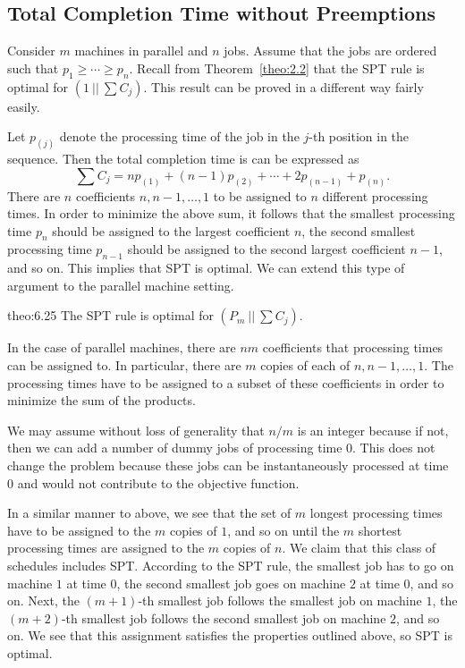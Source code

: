 \subsection{Total Completion Time without Preemptions} \label{subsec:6.4}
Consider $m$ machines in parallel and $n$ jobs. Assume that the 
jobs are ordered such that $p_1 \geq \cdots \geq p_n$. Recall from 
Theorem~\ref{theo:2.2} that the SPT rule is optimal for $(1~||~\sum C_j)$. 
This result can be proved in a different way fairly easily. 

Let $p_{(j)}$ denote the processing time of the job in the $j$-th position 
in the sequence. Then the total completion time is can be expressed as 
\[ \sum C_j = np_{(1)} + (n-1)p_{(2)} + \cdots + 2p_{(n-1)} + p_{(n)}. \] 
There are $n$ coefficients $n, n-1, \dots, 1$ to be assigned to 
$n$ different processing times. In order to minimize the above sum, 
it follows that the smallest processing time $p_n$ should be assigned to 
the largest coefficient $n$, the second smallest processing time $p_{n-1}$ 
should be assigned to the second largest coefficient $n-1$, and so on.
This implies that SPT is optimal. We can extend this type of argument 
to the parallel machine setting. 

\begin{theo}{theo:6.25}
    The SPT rule is optimal for $(P_m~||~\sum C_j)$. 
\end{theo}
\begin{pf}
    In the case of parallel machines, there are $nm$ coefficients that
    processing times can be assigned to. In particular, there are $m$ 
    copies of each of $n, n-1, \dots, 1$. The processing times have to be 
    assigned to a subset of these coefficients in order to minimize the sum of 
    the products. 

    We may assume without loss of generality that $n/m$ is an integer 
    because if not, then we can add a number of dummy jobs of processing time 
    $0$. This does not change the problem because these jobs can be 
    instantaneously processed at time $0$ and would not contribute to the 
    objective function. 

    In a similar manner to above, we see that the set of $m$ longest processing 
    times have to be assigned to the $m$ copies of $1$, and so on until the 
    $m$ shortest processing times are assigned to the $m$ copies of $n$. 
    We claim that this class of schedules includes SPT. According to the 
    SPT rule, the smallest job has to go on machine $1$ at time $0$, the 
    second smallest job goes on machine $2$ at time $0$, and so on. Next, 
    the $(m+1)$-th smallest job follows the smallest job on machine $1$, 
    the $(m+2)$-th smallest job follows the second smallest job on machine $2$, 
    and so on. We see that this assignment satisfies the properties outlined 
    above, so SPT is optimal. 
\end{pf}


